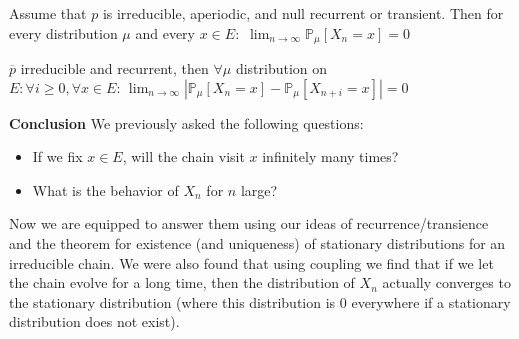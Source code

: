 \begin{theorem}[]
	Assume that $p$ is irreducible, aperiodic, and null recurrent or transient. Then for every distribution $\mu $ and every $x \in E:$ $\lim_{n \to \infty}\mathbb{P}_{\mu } \left[ X_n =x \right] = 0$ 
\end{theorem}
\begin{lemma}[]
	$\overline{p}$ irreducible and recurrent, then $\forall \mu $ distribution on $E: \forall i\geq 0, \forall x \in E:\, \lim_{n \to \infty} | \mathbb{P}_{\mu } \left[ X_n=x \right] - \mathbb{P}_{\mu } \left[ X_{n+i}=x \right] | = 0$
\end{lemma}

\noindent \textbf{Conclusion} We previously asked the following questions:
\begin{itemize}
	\item If we fix $x \in E$, will the chain visit $x$ infinitely many times?
	\item What is the behavior of $X_n$ for $n$ large?
\end{itemize}
Now we are equipped to answer them using our ideas of recurrence/transience and the theorem for existence (and uniqueness) of stationary distributions for an irreducible chain. We were also found that using coupling we find that if we let the chain evolve for a long time, then the distribution of $X_n$ actually converges to the stationary distribution (where this distribution is 0 everywhere if a stationary distribution does not exist).


